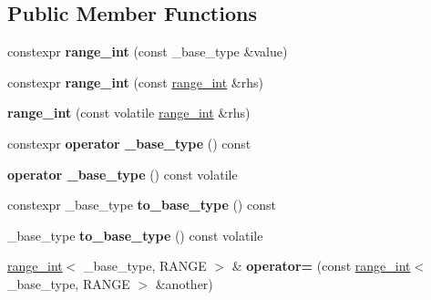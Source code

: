 \subsection*{Public Member Functions}
\begin{DoxyCompactItemize}
\item 
\mbox{\label{classfsl_1_1lg_1_1range__int_a1a1400253adfd449299c41cea331ee61}} 
constexpr {\bfseries range\+\_\+int} (const \+\_\+base\+\_\+type \&value)
\item 
\mbox{\label{classfsl_1_1lg_1_1range__int_ac94eba99f33ff5f811ed046f148f51b0}} 
constexpr {\bfseries range\+\_\+int} (const \mbox{\hyperlink{classfsl_1_1lg_1_1range__int}{range\+\_\+int}} \&rhs)
\item 
\mbox{\label{classfsl_1_1lg_1_1range__int_a03fab3b7204b1c251acb6053d72181ac}} 
{\bfseries range\+\_\+int} (const volatile \mbox{\hyperlink{classfsl_1_1lg_1_1range__int}{range\+\_\+int}} \&rhs)
\item 
\mbox{\label{classfsl_1_1lg_1_1range__int_a08cd60e0694d2a7a29d86221dc6a702b}} 
constexpr {\bfseries operator \+\_\+base\+\_\+type} () const
\item 
\mbox{\label{classfsl_1_1lg_1_1range__int_a0ccee23a812d577e62cedf54d5633792}} 
{\bfseries operator \+\_\+base\+\_\+type} () const volatile
\item 
\mbox{\label{classfsl_1_1lg_1_1range__int_a7d526bca32b05c785d8cbd94ed95da3b}} 
constexpr \+\_\+base\+\_\+type {\bfseries to\+\_\+base\+\_\+type} () const
\item 
\mbox{\label{classfsl_1_1lg_1_1range__int_a7c2df5c4c281ebf98452d2424bb06439}} 
\+\_\+base\+\_\+type {\bfseries to\+\_\+base\+\_\+type} () const volatile
\item 
\mbox{\label{classfsl_1_1lg_1_1range__int_a1356dae4f80c8c2e3b0118320a1e9dcf}} 
\mbox{\hyperlink{classfsl_1_1lg_1_1range__int}{range\+\_\+int}}$<$ \+\_\+base\+\_\+type, R\+A\+N\+GE $>$ \& {\bfseries operator=} (const \mbox{\hyperlink{classfsl_1_1lg_1_1range__int}{range\+\_\+int}}$<$ \+\_\+base\+\_\+type, R\+A\+N\+GE $>$ \&another)

\end{DoxyCompactItemize}
